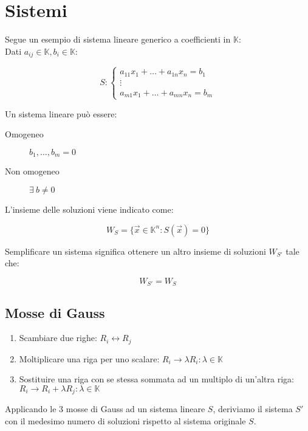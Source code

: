 \documentclass{subfiles}
\begin{document}
\section{Sistemi}

Segue un esempio di sistema lineare generico a coefficienti in $\mathbb{K}$:\\

\noindent
Dati $a_{ij} \in \mathbb{K}, b_i \in \mathbb{K}$:

$$
S: \begin{cases}
a_{11} x_1 + \dots + a_{1n} x_n = b_1\\
\vdots\\
a_{m1} x_1 + \dots + a_{mn} x_n = b_m
\end {cases}
$$

\noindent
Un sistema lineare può essere:

\begin{description}
    \item[Omogeneo] $b_1, \dots, b_m = 0$
    \item[Non omogeneo] $\exists \ b \neq 0$
\end{description}

\noindent
L'insieme delle soluzioni viene indicato come:

$$
W_S = \{ \vec{x} \in \mathbb{K}^n : S(\vec{x}) = 0 \}
$$

\noindent
Semplificare un sistema significa ottenere un altro insieme di soluzioni $W_{S'}$ tale che:

$$
W_{S'} = W_S
$$

\subsection{Mosse di Gauss}

\begin{enumerate}
    \item Scambiare due righe: $R_i \leftrightarrow R_j$
    \item Moltiplicare una riga per uno scalare: $R_i \to \lambda R_i : \lambda \in \mathbb{K}$
    \item Sostituire una riga con se stessa sommata ad un multiplo di un'altra riga: $R_i \to R_i + \lambda R_j : \lambda \in \mathbb{K}$
\end{enumerate}

Applicando le 3 mosse di Gauss ad un sistema lineare $S$, deriviamo il sistema $S'$ con il medesimo numero di soluzioni rispetto al sistema originale $S$.
\end{document}
